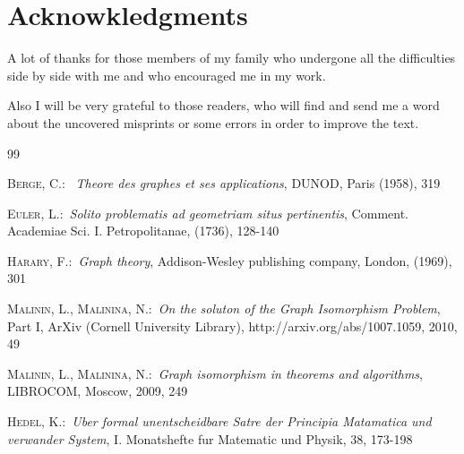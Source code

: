 \documentclass{amsart}
\theoremstyle{plain}
\numberwithin{equation}{section}
\begin{document}
\section {Acknowkledgments}

A lot of thanks for those members of my family who undergone all the difficulties side by side with me and who encouraged me in my work.  

Also I will be very grateful to those readers, who will find and send me a word about the uncovered misprints or some errors in order to improve the text. 

\begin {thebibliography} {99}

 \textsc{Berge, C.}:\ \textit{ Theore des graphes et ses applications}, DUNOD, Paris (1958), 319

 \textsc{Euler, L.}:\ \textit{Solito problematis ad geometriam situs pertinentis}, Comment. Academiae Sci. I. Petropolitanae, (1736), 128-140

 \textsc{Harary, F.}:\ \textit{Graph theory}, Addison-Wesley publishing company, London, (1969), 301

 \textsc{Malinin, L., Malinina, N.}:\ \textit{On the soluton of the Graph Isomorphism Problem}, Part I, ArXiv (Cornell University Library), http://arxiv.org/abs/1007.1059, 2010, 49

 \textsc{Malinin, L., Malinina, N.}:\ \textit{Graph isomorphism in theorems and algorithms}, LIBROCOM, Moscow, 2009, 249

 \textsc{Hedel, K.}:\ \textit{Uber formal unentscheidbare Satre der Principia Matamatica und verwander System}, I. Monatshefte fur Matematic und Physik, 38, 173-198

\end {thebibliography} 
\end{document}
